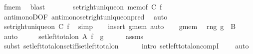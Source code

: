 \begin{isabellebody}
\ f{\isacharunderscore}{\kern0pt}mem\ \isamarkupfalse%
\ blast\isanewline
\ \ \ \ \isamarkupfalse%
\ \isamarkupfalse%
\ {\isachardoublequoteopen}set{\isacharunderscore}{\kern0pt}right{\isacharunderscore}{\kern0pt}unique{\isacharunderscore}{\kern0pt}on\ {\isacharparenleft}{\kern0pt}mem{\isacharunderscore}{\kern0pt}of\ {\isacharquery}{\kern0pt}C{\isacharparenright}{\kern0pt}\ f{\isachardoublequoteclose}\isanewline
\ \ \ \ \ \ \isamarkupfalse%
\ antimonoD{\isacharbrackleft}{\kern0pt}OF\ antimono{\isacharunderscore}{\kern0pt}set{\isacharunderscore}{\kern0pt}right{\isacharunderscore}{\kern0pt}unique{\isacharunderscore}{\kern0pt}on{\isacharunderscore}{\kern0pt}pred{\isacharbrackright}{\kern0pt}\ \isamarkupfalse%
\ auto\isanewline
\ \ \ \ \isamarkupfalse%
\ \isamarkupfalse%
\ {\isachardoublequoteopen}set{\isacharunderscore}{\kern0pt}right{\isacharunderscore}{\kern0pt}unique{\isacharunderscore}{\kern0pt}on\ {\isacharquery}{\kern0pt}C\ f{\isachardoublequoteclose}\ \isamarkupfalse%
\ simp\isanewline
\ \ \isamarkupfalse%
\ {\isacharparenleft}{\kern0pt}insert\ g{\isacharunderscore}{\kern0pt}mem{\isacharcomma}{\kern0pt}\ auto{\isacharparenright}{\kern0pt}\isanewline
\ \ \isamarkupfalse%
\ g{\isacharunderscore}{\kern0pt}mem\ \isamarkupfalse%
\ {\isachardoublequoteopen}rng\ g\ {\isasymsubseteq}\ B{\isachardoublequoteclose}\ \isamarkupfalse%
\ auto\isanewline
\ \ \isamarkupfalse%
\ \isamarkupfalse%
\ {\isachardoublequoteopen}set{\isacharunderscore}{\kern0pt}left{\isacharunderscore}{\kern0pt}total{\isacharunderscore}{\kern0pt}on\ A\ {\isacharparenleft}{\kern0pt}f\ {\isasymcirc}\ g{\isacharparenright}{\kern0pt}{\isachardoublequoteclose}\isanewline
\ \ \ \ \isamarkupfalse%
\ assms\ \isamarkupfalse%
\ {\isacharparenleft}{\kern0pt}subst\ set{\isacharunderscore}{\kern0pt}left{\isacharunderscore}{\kern0pt}total{\isacharunderscore}{\kern0pt}on{\isacharunderscore}{\kern0pt}set{\isacharunderscore}{\kern0pt}iff{\isacharunderscore}{\kern0pt}set{\isacharunderscore}{\kern0pt}left{\isacharunderscore}{\kern0pt}total{\isacharunderscore}{\kern0pt}on{\isacharcomma}{\kern0pt}\isanewline
\ \ \ \ \ \ intro\ set{\isacharunderscore}{\kern0pt}left{\isacharunderscore}{\kern0pt}total{\isacharunderscore}{\kern0pt}on{\isacharunderscore}{\kern0pt}compI{\isacharparenright}{\kern0pt}\isanewline
\ \ \ \ auto\isanewline
{}\isamarkupfalse%

\end{isabellebody}
